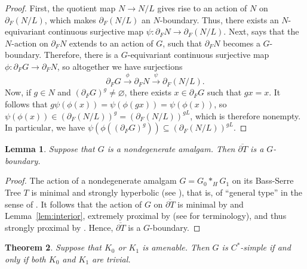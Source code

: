 \documentclass[a4paper]{amsart}
\theoremstyle{plain}
\newtheorem{theorem}{Theorem}
\newtheorem{lemma}[theorem]{Lemma}
\theoremstyle{definition}
\theoremstyle{remark}
\numberwithin{theorem}{section}
\begin{document}
\begin{proof}
First, the quotient map $N\to N/L$ gives rise to an action of $N$ on $\partial_F(N/L)$,
which makes $\partial_F(N/L)$ an $N$-boundary.
Thus, there exists an $N$-equivariant continuous surjective map $\psi\colon\partial_F N\to\partial_F(N/L)$.
Next, \cite[Lemma~5.2]{BKKO} says that the $N$-action on $\partial_F N$ extends to an action of $G$,
such that $\partial_F N$ becomes a $G$-boundary.
Therefore, there is a $G$-equivariant continuous surjective map $\phi\colon\partial_F G\to\partial_F N$,
so altogether we have surjections
\[
\partial_F G\overset{\phi}{\longrightarrow}\partial_F N\overset{\psi}{\longrightarrow}\partial_F(N/L).
\]
Now, if $g\in N$ and $(\partial_F G)^g\neq\varnothing$, there exists $x\in \partial_F G$ such that $gx=x$.
It follows that $g\psi(\phi(x))=\psi(\phi(gx))=\psi(\phi(x))$, so $\psi(\phi(x))\in(\partial_F(N/L))^g=(\partial_F(N/L))^{gL}$,
which is therefore nonempty.
In particular, we have $\psi(\phi((\partial_F G)^g))\subseteq (\partial_F(N/L))^{gL}$.
\end{proof}

\begin{lemma}\label{lem:T-boundary}
Suppose that $G$ is a nondegenerate amalgam.
Then $\overline{\partial T}$ is a $G$-boundary.
\end{lemma}

\begin{proof}
The action of a nondegenerate amalgam $G=G_0*_H G_1$ on its Bass-Serre Tree $T$ is minimal and strongly hyperbolic (see \cite[Proposition~19]{HP}),
that is, of ``general type'' in the sense of \cite[Section~4.3]{Boudec-Bon}.
It follows that the action of $G$ on $\overline{\partial T}$ is minimal by \cite[Proposition~19]{HP} and Lemma~\ref{lem:interior},
extremely proximal by \cite[Proposition~4.26]{Boudec-Bon} (see \cite[Section~2.1]{Boudec-Bon} for terminology),
and thus strongly proximal by \cite[Theorem~2.3~(3.3)]{Glasner}.
Hence, $\overline{\partial T}$ is a $G$-boundary.
\end{proof}

\begin{theorem}\label{thm:K0K1-amenable}
Suppose that $K_0$ or $K_1$ is amenable.
Then $G$ is $C^*$-simple if and only if both $K_0$ and $K_1$ are trivial.
\end{theorem}
\end{document}
